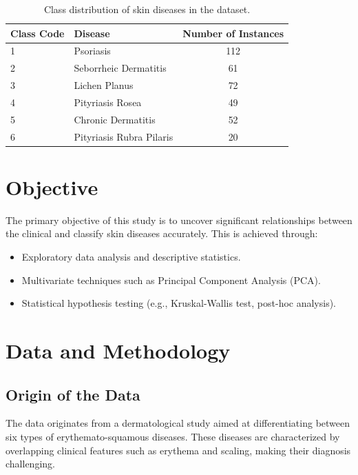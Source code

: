 \documentclass[a4paper,12pt]{article}
\begin{document}
\begin{table}[h!]
\centering
\begin{tabular}{llc}
\toprule
\textbf{Class Code} & \textbf{Disease}                  & \textbf{Number of Instances} \\
\midrule
1                  & Psoriasis                         & 112 \\
2                  & Seborrheic Dermatitis             & 61  \\
3                  & Lichen Planus                     & 72  \\
4                  & Pityriasis Rosea                  & 49  \\
5                  & Chronic Dermatitis                & 52  \\
6                  & Pityriasis Rubra Pilaris          & 20  \\
\bottomrule
\end{tabular}
\caption{Class distribution of skin diseases in the dataset.}
\end{table}

\section{Objective}
The primary objective of this study is to uncover significant relationships between the clinical and classify skin diseases accurately. This is achieved through:
\begin{itemize}
    \item Exploratory data analysis and descriptive statistics.
    \item Multivariate techniques such as Principal Component Analysis (PCA).
    \item Statistical hypothesis testing (e.g., Kruskal-Wallis test, post-hoc analysis).
\end{itemize}

\section{Data and Methodology}

\subsection{Origin of the Data}
The data originates from a dermatological study aimed at differentiating between six types of erythemato-squamous diseases. These diseases are characterized by overlapping clinical features such as erythema and scaling, making their diagnosis challenging. 
\end{document}
